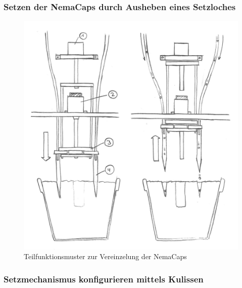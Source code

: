 \subsubsection{Setzen der NemaCaps durch Ausheben eines Setzloches}

\begin{figure}[H]
	\includegraphics[width=1\textwidth]{Illustrationen/5-Konzept/blau_Setzeinheit_ohneLegende.jpg}
	\caption{Teilfunktionsmuster zur Vereinzelung der NemaCaps}
	\label{fig:blau_setzeinheit}
\end{figure}

\subsubsection{Setzmechanismus konfigurieren mittels Kulissen}

